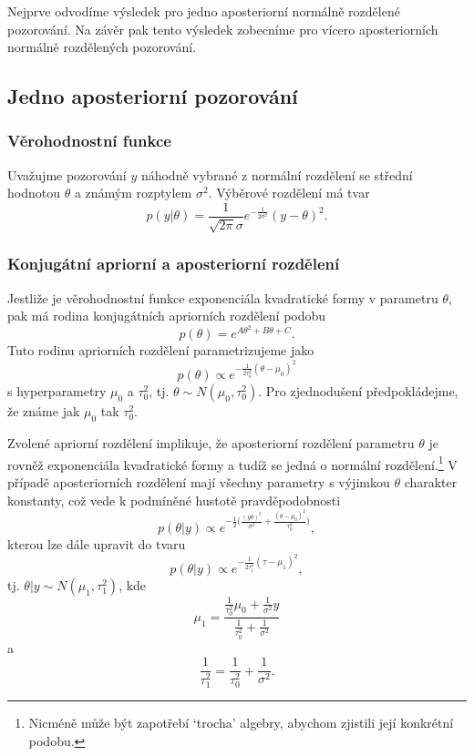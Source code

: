 Nejprve odvodíme výsledek pro jedno aposteriorní normálně rozdělené pozorování. Na závěr pak tento výsledek zobecníme pro vícero aposteriorních normálně rozdělených pozorování.

\subsection{Jedno aposteriorní pozorování}

\subsubsection{Věrohodnostní funkce}

Uvažujme pozorování $y$ náhodně vybrané z normální rozdělení se střední hodnotou $\theta$ a známým rozptylem $\sigma^2$. Výběrové rozdělení má tvar
\begin{equation}
p(y|\theta) = \frac{1}{\sqrt{2 \pi} \sigma} e^{-\frac{1}{2 \sigma^2}}(y - \theta)^2.
\end{equation}

\subsubsection{Konjugátní apriorní a aposteriorní rozdělení}

Jestliže je věrohodnostní funkce exponenciála kvadratické formy v parametru $\theta$, pak má rodina konjugátních apriorních rozdělení podobu
\begin{equation}
p(\theta) = e^{A \theta^2 + B \theta + C}.
\end{equation}
Tuto rodinu apriorních rozdělení parametrizujeme jako
\begin{equation}
p(\theta) \varpropto e^{-\frac{1}{2 \tau_0^2} (\theta - \mu_0)^2}
\end{equation}
s hyperparametry $\mu_0$ a $\tau_0^2$, tj. $\theta \sim N(\mu_0, \tau_0^2)$. Pro zjednodušení předpokládejme, že známe jak $\mu_0$ tak $\tau_0^2$.

Zvolené apriorní rozdělení implikuje, že aposteriorní rozdělení parametru $\theta$ je rovněž exponenciála kvadratické formy a tudíž se  jedná o normální rozdělení.\footnote{Nicméně může být zapotřebí `trocha' algebry, abychom zjistili její konkrétní podobu.} V případě aposteriorních rozdělení mají všechny parametry s výjimkou $\theta$ charakter konstanty, což vede k podmíněné hustotě pravděpodobnosti
\begin{equation}
p(\theta | y) \varpropto e^{-\frac{1}{2}\Big(\frac{(y  \theta)^2}{\sigma^2} + \frac{(\theta - \mu_0)^2}{\tau_0^2} \Big)},
\end{equation}
kterou lze dále upravit do tvaru
\begin{equation}
p(\theta | y) \varpropto e^{-\frac{1}{2 \tau_1^2}(\tau - \mu_1)^2},
\end{equation}
tj. $\theta | y \sim N(\mu_1, \tau_1^2)$, kde
\begin{equation}
\mu_1 = \frac{\frac{1}{\tau_0^2} \mu_0 + \frac{1}{\sigma^2}y}{\frac{1}{\tau_0^2} + \frac{1}{\sigma^2}}
\end{equation}
a
\begin{equation}
\frac{1}{\tau_1^2} = \frac{1}{\tau_0^2} + \frac{1}{\sigma^2}.
\end{equation}

